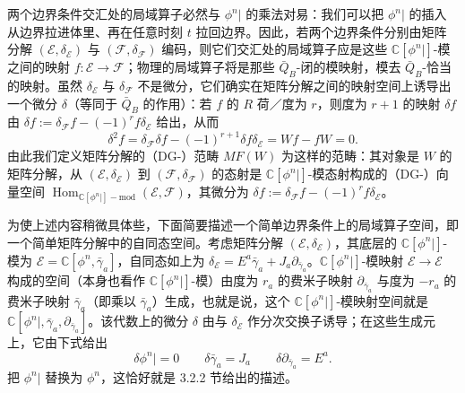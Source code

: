 两个边界条件交汇处的局域算子必然与 $\phi^n|$ 的乘法对易：我们可以把 $\phi^n|$ 的插入从边界拉进体里、再在任意时刻 $t$ 拉回边界。因此，若两个边界条件分别由矩阵分解 $(\mathcal{E},\delta_{\mathcal{E}})$ 与 $(\mathcal{F},\delta_{\mathcal{F}})$ 编码，则它们交汇处的局域算子应是这些 $\mathbb{C}[\phi^n|]$-模之间的映射 $f:\mathcal{E}\to\mathcal{F}$；物理的局域算子将是那些 $\bar Q_B$-闭的模映射，模去 $\bar Q_B$-恰当的映射。虽然 $\delta_{\mathcal{E}}$ 与 $\delta_{\mathcal{F}}$ 不是微分，它们确实在矩阵分解之间的映射空间上诱导出一个微分 $\delta$（等同于 $\bar Q_B$ 的作用）：若 $f$ 的 $R$ 荷／度为 $r$，则度为 $r+1$ 的映射 $\delta f$ 由 $\delta f:=\delta_{\mathcal{F}}f-(-1)^r f\delta_{\mathcal{E}}$ 给出，从而
\begin{equation}\tag{C.15}
  \delta^2f=\delta_{\mathcal{F}}\delta f-(-1)^{r+1}\delta f\delta_{\mathcal{E}}=Wf-fW=0.
\end{equation}
由此我们定义矩阵分解的（DG-）范畴 $MF(W)$ 为这样的范畴：其对象是 $W$ 的矩阵分解，从 $(\mathcal{E},\delta_{\mathcal{E}})$ 到 $(\mathcal{F},\delta_{\mathcal{F}})$ 的态射是 $\mathbb{C}[\phi^n|]$-模态射构成的（DG-）向量空间 $\operatorname{Hom}_{\mathbb{C}[\phi^n|]-\mathrm{mod}}(\mathcal{E},\mathcal{F})$，其微分为 $\delta f:=\delta_{\mathcal{F}}f-(-1)^r f\delta_{\mathcal{E}}$。

为使上述内容稍微具体些，下面简要描述一个简单边界条件上的局域算子空间，即一个简单矩阵分解中的自同态空间。考虑矩阵分解 $(\mathcal{E},\delta_{\mathcal{E}})$，其底层的 $\mathbb{C}[\phi^n|]$-模为 $\mathcal{E}=\mathbb{C}[\phi^n,\bar\gamma_a]$，自同态如上为 $\delta_{\mathcal{E}}=E^a\bar\gamma_a+J_a\partial_{\bar\gamma_a}$。$\mathbb{C}[\phi^n|]$-模映射 $\mathcal{E}\to\mathcal{E}$ 构成的空间（本身也看作 $\mathbb{C}[\phi^n|]$-模）由度为 $r_a$ 的费米子映射 $\partial_{\bar\gamma_a}$ 与度为 $-r_a$ 的费米子映射 $\bar\gamma_a$（即乘以 $\bar\gamma_a$）生成，也就是说，这个 $\mathbb{C}[\phi^n|]$-模映射空间就是 $\mathbb{C}[\phi^n|,\bar\gamma_a,\partial_{\bar\gamma_a}]$。该代数上的微分 $\delta$ 由与 $\delta_{\mathcal{E}}$ 作分次交换子诱导；在这些生成元上，它由下式给出
\begin{equation}\tag{C.16}
  \delta\phi^n|=0\qquad \delta\bar\gamma_a=J_a\qquad \delta\partial_{\bar\gamma_a}=E^a.
\end{equation}
把 $\phi^n|$ 替换为 $\phi^n$，这恰好就是 3.2.2 节给出的描述。
